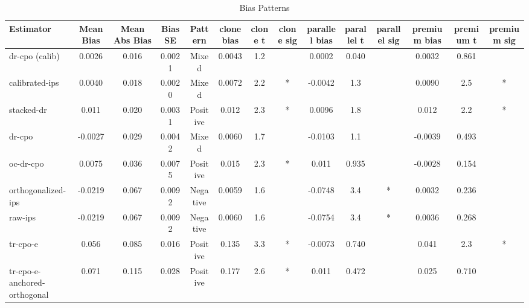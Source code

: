 \begin{table}[htbp]
\centering
\caption{Bias Patterns}
\label{tab:A2}
\begin{tabular}{l|ccccccccccccc}
\toprule
Estimator & Mean Bias & Mean Abs Bias & Bias SE & Pattern & clone bias & clone t & clone sig & parallel bias & parallel t & parallel sig & premium bias & premium t & premium sig \\
\midrule
dr-cpo (calib) & 0.0026 & 0.016 & 0.0021 & Mixed & 0.0043 & 1.2 &  & 0.0002 & 0.040 &  & 0.0032 & 0.861 &  \\
calibrated-ips & 0.0040 & 0.018 & 0.0020 & Mixed & 0.0072 & 2.2 & * & -0.0042 & 1.3 &  & 0.0090 & 2.5 & * \\
stacked-dr & 0.011 & 0.020 & 0.0031 & Positive & 0.012 & 2.3 & * & 0.0096 & 1.8 &  & 0.012 & 2.2 & * \\
dr-cpo & -0.0027 & 0.029 & 0.0042 & Mixed & 0.0060 & 1.7 &  & -0.0103 & 1.1 &  & -0.0039 & 0.493 &  \\
oc-dr-cpo & 0.0075 & 0.036 & 0.0075 & Positive & 0.015 & 2.3 & * & 0.011 & 0.935 &  & -0.0028 & 0.154 &  \\
orthogonalized-ips & -0.0219 & 0.067 & 0.0092 & Negative & 0.0059 & 1.6 &  & -0.0748 & 3.4 & * & 0.0032 & 0.236 &  \\
raw-ips & -0.0219 & 0.067 & 0.0092 & Negative & 0.0060 & 1.6 &  & -0.0754 & 3.4 & * & 0.0036 & 0.268 &  \\
tr-cpo-e & 0.056 & 0.085 & 0.016 & Positive & 0.135 & 3.3 & * & -0.0073 & 0.740 &  & 0.041 & 2.3 & * \\
tr-cpo-e-anchored-orthogonal & 0.071 & 0.115 & 0.028 & Positive & 0.177 & 2.6 & * & 0.011 & 0.472 &  & 0.025 & 0.710 &  \\
\bottomrule
\end{tabular}
\end{table}